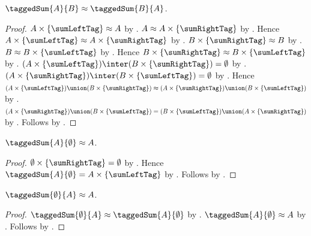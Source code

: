 \begin{proposition}\label{tagged_sum_equinum_commutative}
    $\taggedSum{A}{B}\approx\taggedSum{B}{A}$.
\end{proposition}
\begin{proof}
    $A\times\{\sumLeftTag\}\approx A$
        by .
    $A\approx A\times\{\sumRightTag\}$
        by .
    Hence $A\times\{\sumLeftTag\}
        \approx A\times\{\sumRightTag\}$ by .
    $B\times\{\sumRightTag\}\approx B$
        by .
    $B\approx B\times\{\sumLeftTag\}$
        by .
    Hence $B\times\{\sumRightTag\}
        \approx B\times\{\sumLeftTag\}$ by .
    $(A\times\{\sumLeftTag\})\inter
        (B\times\{\sumRightTag\})=\emptyset$
        by .
    $(A\times\{\sumRightTag\})\inter
        (B\times\{\sumLeftTag\})=\emptyset$
        by .
    Hence
        $(A\times\{\sumLeftTag\})\union
            (B\times\{\sumRightTag\})
        \approx
        (A\times\{\sumRightTag\})\union
            (B\times\{\sumLeftTag\})$
        by .
    $(A\times\{\sumRightTag\})\union
        (B\times\{\sumLeftTag\})
        =(B\times\{\sumLeftTag\})\union
            (A\times\{\sumRightTag\})$
        by .
    Follows by .
\end{proof}

\begin{proposition}\label{tagged_sum_empty_right_equinum}
    $\taggedSum{A}{\emptyset}\approx A$.
\end{proposition}
\begin{proof}
    $\emptyset\times\{\sumRightTag\}=\emptyset$
        by .
    Hence $\taggedSum{A}{\emptyset}
        =A\times\{\sumLeftTag\}$
        by .
    Follows by .
\end{proof}

\begin{corollary}\label{tagged_sum_empty_left_equinum}
    $\taggedSum{\emptyset}{A}\approx A$.
\end{corollary}
\begin{proof}
    $\taggedSum{\emptyset}{A}\approx\taggedSum{A}{\emptyset}$
        by .
    $\taggedSum{A}{\emptyset}\approx A$
        by .
    Follows by .
\end{proof}

